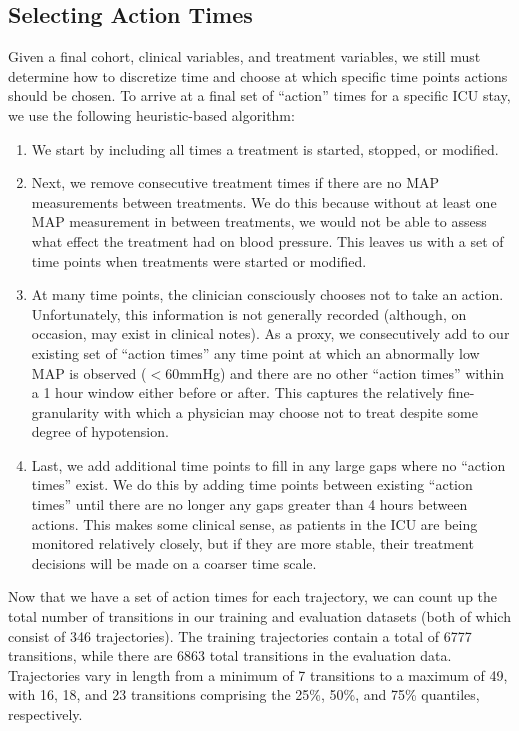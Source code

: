 \documentclass{article}
\begin{document}
\subsection{Selecting Action Times}

Given a final cohort, clinical variables, and treatment variables, we still must determine how to discretize time and choose at which specific time points actions should be chosen. To arrive at a final set of ``action'' times for a specific ICU stay, we use the following heuristic-based algorithm:
\begin{enumerate}
    \item We start by including all times a treatment is started, stopped, or modified.
    \item Next, we remove consecutive treatment times if there are no MAP measurements between treatments. We do this because without at least one MAP measurement in between treatments, we would not be able to assess what effect the treatment had on blood pressure. This leaves us with a set of time points when treatments were started or modified. 
    \item At many time points, the clinician consciously chooses not to take an action. Unfortunately, this information is not generally recorded (although, on occasion, may exist in clinical notes). As a proxy, we consecutively add to our existing set of ``action times'' any time point at which an abnormally low MAP is observed ($<60$mmHg) and there are no other ``action times'' within a 1 hour window either before or after. This captures the relatively fine-granularity with which a physician may choose not to treat despite some degree of hypotension.
    \item Last, we add additional time points to fill in any large gaps where no ``action times'' exist. We do this by adding time points between existing ``action times'' until there are no longer any gaps greater than 4 hours between actions. This makes some clinical sense, as patients in the ICU are being monitored relatively closely, but if they are more stable, their treatment decisions will be made on a coarser time scale.
\end{enumerate}

Now that we have a set of action times for each trajectory, we can count up the total number of transitions in our training and evaluation datasets (both of which consist of 346 trajectories). The training trajectories contain a total of 6777 transitions, while there are 6863 total transitions in the evaluation data. Trajectories vary in length from a minimum of 7 transitions to a maximum of 49, with 16, 18, and 23 transitions comprising the 25\%, 50\%, and 75\% quantiles, respectively.
\end{document}
